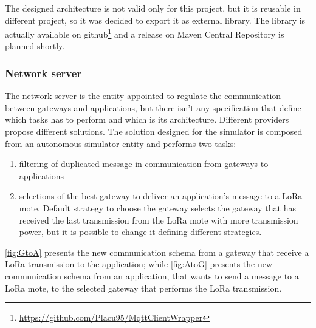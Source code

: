 \noindent The designed architecture is not valid only for this project, but it is reusable in different project, so it was decided to export it as external library. The library is actually available on github\footnote{\href{https://github.com/Placu95/MqttClientWrapper}{https://github.com/Placu95/MqttClientWrapper}} and a release on Maven Central Repository is planned shortly.

\subsubsection{Network server}
The network server is the entity appointed to regulate the communication between gateways and applications, but there isn't any specification that define which tasks has to perform and which is its architecture. 
Different providers propose different solutions. 
The solution designed for the simulator is composed from an autonomous simulator entity and performs two tasks:
\begin{enumerate}
    \item filtering of duplicated message in communication from gateways to applications
    \item selections of the best gateway to deliver an application's message to a LoRa mote. 
    Default strategy to choose the gateway selects the gateway that has received the last transmission from the LoRa mote with more transmission power, but it is possible to change it defining different strategies. 
\end{enumerate}
\autoref{fig:GtoA} presents the new communication schema from a gateway that receive a LoRa transmission to the application; while \autoref{fig:AtoG} presents the new communication schema from an application, that wants to send a message to a LoRa mote, to the selected gateway that performs the LoRa transmission.
